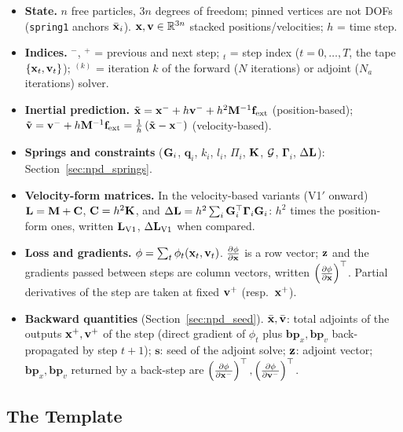 \begin{itemize}
    \item \textbf{State.} $n$ free particles, $3n$ degrees of freedom; pinned vertices are not DOFs (\texttt{spring1} anchors $\bar{\mathbf{x}}_i$). $\mathbf{x}, \mathbf{v} \in \mathbb{R}^{3n}$ stacked positions/velocities; $h$ = time step.
    \item \textbf{Indices.} $^-$, $^+$ = previous and next step; $_t$ = step index ($t = 0,\dots,T$, the tape $\left\{\mathbf{x}_t, \mathbf{v}_t\right\}$); $^{(k)}$ = iteration $k$ of the forward ($N$ iterations) or adjoint ($N_a$ iterations) solver.
    \item \textbf{Inertial prediction.} $\tilde{\mathbf{x}} = \mathbf{x}^- + h\mathbf{v}^- + h^2\mathbf{M}^{-1}\mathbf{f}_{\text{ext}}$ (position-based); $\tilde{\mathbf{v}} = \mathbf{v}^- + h\mathbf{M}^{-1}\mathbf{f}_{\text{ext}} = \tfrac{1}{h}\left(\tilde{\mathbf{x}} - \mathbf{x}^-\right)$ (velocity-based).
    \item \textbf{Springs and constraints} ($\mathbf{G}_i$, $\mathbf{q}_i$, $k_i$, $l_i$, $\Pi_i$, $\mathbf{K}$, $\mathcal{G}$, $\boldsymbol{\Gamma}_i$, $\Delta\mathbf{L}$): Section~\ref{sec:npd_springs}.
    \item \textbf{Velocity-form matrices.} In the velocity-based variants (V1$'$ onward) $\mathbf{L} = \mathbf{M} + \mathbf{C}$, $\mathbf{C} = h^2\mathbf{K}$, and $\Delta\mathbf{L} = h^2\sum_i\mathbf{G}_i^\top\boldsymbol{\Gamma}_i\mathbf{G}_i$: $h^2$ times the position-form ones, written $\mathbf{L}_{\text{V1}}$, $\Delta\mathbf{L}_{\text{V1}}$ when compared.
    \item \textbf{Loss and gradients.} $\phi = \sum_t\phi_t(\mathbf{x}_t, \mathbf{v}_t)$. $\frac{\partial \phi}{\partial \mathbf{x}}$ is a row vector; $\mathbf{z}$ and the gradients passed between steps are column vectors, written $\left(\frac{\partial \phi}{\partial \mathbf{x}}\right)^\top$. Partial derivatives of the step are taken at fixed $\mathbf{v}^+$ (resp.\ $\mathbf{x}^+$).
    \item \textbf{Backward quantities} (Section~\ref{sec:npd_seed}). $\bar{\mathbf{x}}, \bar{\mathbf{v}}$: total adjoints of the outputs $\mathbf{x}^+, \mathbf{v}^+$ of the step (direct gradient of $\phi_t$ plus $\mathbf{bp}_x, \mathbf{bp}_v$ back-propagated by step $t+1$); $\mathbf{s}$: seed of the adjoint solve; $\mathbf{z}$: adjoint vector; $\mathbf{bp}_x, \mathbf{bp}_v$ returned by a back-step are $\left(\frac{\partial \phi}{\partial \mathbf{x}^-}\right)^\top, \left(\frac{\partial \phi}{\partial \mathbf{v}^-}\right)^\top$.
\end{itemize}

\subsection{The Template}
\label{sec:npd_template}

